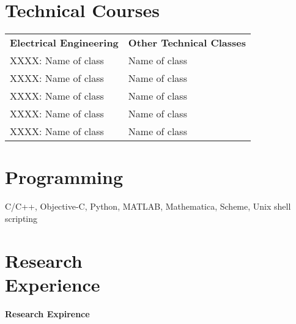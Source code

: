 \documentclass[margin,line]{resume}
\begin{document}
\begin{resume}


\section{\mysidestyle Technical Courses}


\begin{tabular}{ l l }

\textbf{Electrical Engineering} & \textbf{Other Technical Classes} \\

XXXX: Name of class& Name of class \\

XXXX: Name of class& Name of class \\

XXXX: Name of class& Name of class \\

XXXX: Name of class& Name of class \\

XXXX: Name of class& Name of class

\end{tabular}



\section{\mysidestyle Programming}

C/C++, Objective-C, Python, MATLAB, Mathematica, Scheme, Unix shell scripting



\section{\mysidestyle Research\\Experience}

\textbf{Research Expirence} \vspace{0mm}\\\vspace{1mm}%


\end{resume}
\end{document}
